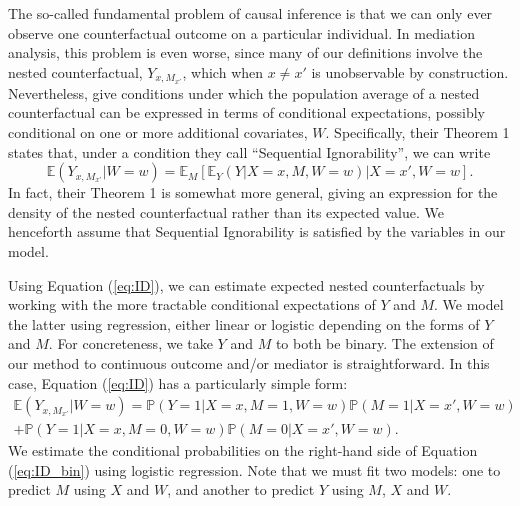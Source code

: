 \documentclass{article}
\newcommand{\bP}{\mathbb{P}}
\newcommand{\bE}{\mathbb{E}}
\begin{document}
The so-called fundamental problem of causal inference is that we can only ever observe one counterfactual outcome on a particular individual. In mediation analysis, this problem is even worse, since many of our definitions involve the nested counterfactual, $Y_{x, M_{x'}}$, which when $x \neq x'$ is unobservable by construction. Nevertheless, \citet{Ima10I} give conditions under which the population average of a nested counterfactual can be expressed in terms of conditional expectations, possibly conditional on one or more additional covariates, $W$. Specifically, their Theorem 1 states that, under a condition they call ``Sequential Ignorability'', we can write
%
\begin{equation}
    \bE (Y_{x, M_{x'}} | W=w) = \bE_M \left[ \bE_Y \left( Y | X=x, M, W=w \right) | X=x', W=w \right]. \label{eq:ID}
\end{equation}
%
In fact, their Theorem 1 is somewhat more general, giving an expression for the density of the nested counterfactual rather than its expected value. We henceforth assume that Sequential Ignorability is satisfied by the variables in our model.

Using Equation (\ref{eq:ID}), we can estimate expected nested counterfactuals by working with the more tractable conditional expectations of $Y$ and $M$. We model the latter using regression, either linear or logistic depending on the forms of $Y$ and $M$. For concreteness, we take $Y$ and $M$ to both be binary. The extension of our method to continuous outcome and/or mediator is straightforward. In this case, Equation (\ref{eq:ID}) has a particularly simple form:
%
\begin{multline}
    \bE (Y_{x, M_{x'}} | W=w) = \bP \left( Y=1 | X=x, M=1, W=w \right) \bP(M=1 | X = x', W=w) \\ + \bP \left( Y=1 | X=x, M=0, W=w \right) \bP(M=0 | X = x', W=w). \label{eq:ID_bin}
\end{multline}
%
We estimate the conditional probabilities on the right-hand side of Equation (\ref{eq:ID_bin}) using logistic regression. Note that we must fit two models: one to predict $M$ using $X$ and $W$, and another to predict $Y$ using $M$, $X$ and $W$.
\end{document}
